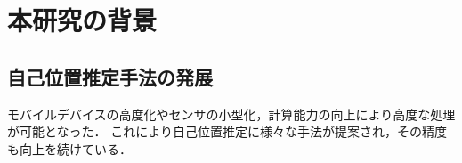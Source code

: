 \section{本研究の背景}
\subsection{自己位置推定手法の発展}
モバイルデバイスの高度化やセンサの小型化，計算能力の向上により高度な処理が可能となった．
これにより自己位置推定に様々な手法が提案され，その精度も向上を続けている．